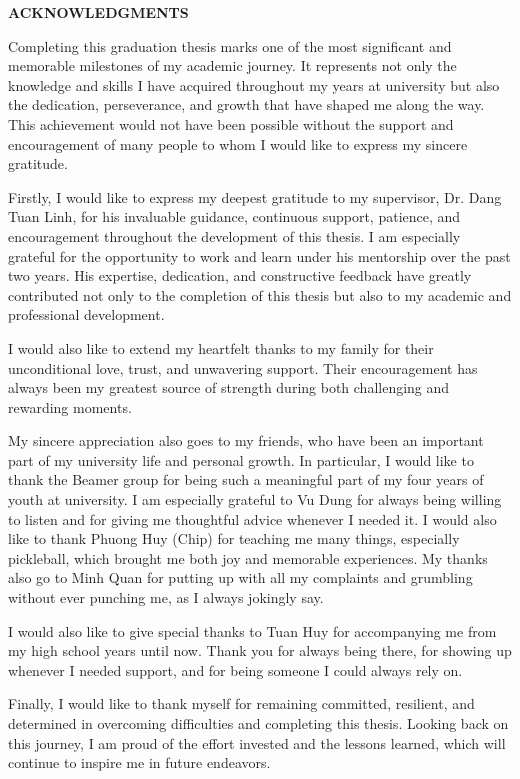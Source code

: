 \documentclass[../Main.tex]{subfiles}
\begin{document}
\begin{center}
    \Large{\textbf{ACKNOWLEDGMENTS}}\\
\end{center}
\vspace{1cm}
Completing this graduation thesis marks one of the most significant and memorable milestones of my academic journey. It represents not only the knowledge and skills I have acquired throughout my years at university but also the dedication, perseverance, and growth that have shaped me along the way. This achievement would not have been possible without the support and encouragement of many people to whom I would like to express my sincere gratitude.

Firstly, I would like to express my deepest gratitude to my supervisor, Dr. Dang Tuan Linh, for his invaluable guidance, continuous support, patience, and encouragement throughout the development of this thesis. I am especially grateful for the opportunity to work and learn under his mentorship over the past two years. His expertise, dedication, and constructive feedback have greatly contributed not only to the completion of this thesis but also to my academic and professional development.

I would also like to extend my heartfelt thanks to my family for their unconditional love, trust, and unwavering support. Their encouragement has always been my greatest source of strength during both challenging and rewarding moments.

My sincere appreciation also goes to my friends, who have been an important part of my university life and personal growth. In particular, I would like to thank the Beamer group for being such a meaningful part of my four years of youth at university. I am especially grateful to Vu Dung for always being willing to listen and for giving me thoughtful advice whenever I needed it. I would also like to thank Phuong Huy (Chip) for teaching me many things, especially pickleball, which brought me both joy and memorable experiences. My thanks also go to Minh Quan for putting up with all my complaints and grumbling without ever punching me, as I always jokingly say.

I would also like to give special thanks to Tuan Huy for accompanying me from my high school years until now. Thank you for always being there, for showing up whenever I needed support, and for being someone I could always rely on.

Finally, I would like to thank myself for remaining committed, resilient, and determined in overcoming difficulties and completing this thesis. Looking back on this journey, I am proud of the effort invested and the lessons learned, which will continue to inspire me in future endeavors.
\end{document}
